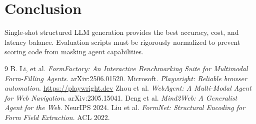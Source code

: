 \documentclass[conference]{IEEEtran}
\begin{document}
\section{Conclusion}
Single-shot structured LLM generation provides the best accuracy, cost, and latency balance. Evaluation scripts must be rigorously normalized to prevent scoring code from masking agent capabilities.

\begin{thebibliography}{9}
  B. Li, et al. \emph{FormFactory: An Interactive Benchmarking Suite for Multimodal Form-Filling Agents}. arXiv:2506.01520.
  Microsoft. \emph{Playwright: Reliable browser automation}. \url{https://playwright.dev}
  Zhou et al. \emph{WebAgent: A Multi-Modal Agent for Web Navigation}. arXiv:2305.15041.
  Deng et al. \emph{Mind2Web: A Generalist Agent for the Web}. NeurIPS 2024.
  Liu et al. \emph{FormNet: Structural Encoding for Form Field Extraction}. ACL 2022.
\end{thebibliography}
\end{document}
